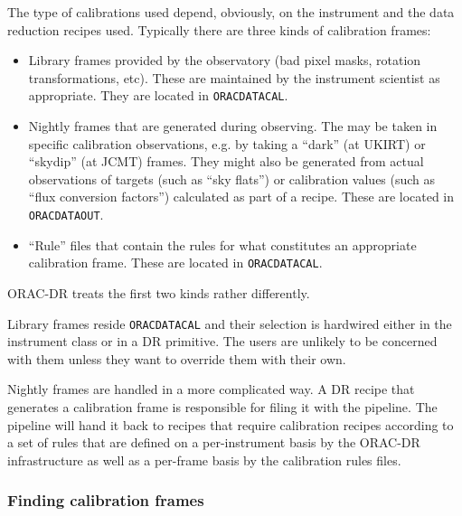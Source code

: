 \documentclass[twoside,11pt]{article}
\renewcommand{\_}{\texttt{\symbol{95}}}
\begin{document}
The type of calibrations used depend, obviously, on the instrument and
the data reduction recipes used. Typically there are three kinds of
calibration frames:

\begin{itemize}

\item

Library frames provided by the observatory (bad pixel masks, rotation
transformations, etc).  These are maintained by the instrument
scientist as appropriate.  They are located in \texttt{ORAC\_DATA\_CAL}.


\item

Nightly frames that are generated during observing.  The may be taken
in specific calibration observations, e.g. by taking a ``dark'' (at UKIRT)
or ``skydip'' (at JCMT) frames.  They might also be generated from
actual observations of targets (such as ``sky flats'') or
calibration values (such as ``flux conversion factors'') calculated
as part of a recipe.  These are located in \texttt{ORAC\_DATA\_OUT}.


\item

``Rule'' files that contain the rules for what constitutes an
appropriate calibration frame.  These are located in \texttt{ORAC\_DATA\_CAL}.

\end{itemize}


ORAC-DR treats the first two kinds rather differently.



Library frames reside \texttt{ORAC\_DATA\_CAL} and their selection is hardwired
either in the instrument class or in a DR primitive.  The users are
unlikely to be concerned with them unless they want to override them
with their own.



Nightly frames are handled in a more complicated way.  A DR recipe
that generates a calibration frame is responsible for filing it with
the pipeline.  The pipeline will hand it back to recipes that require
calibration recipes according to a set of rules that are defined on a
per-instrument basis by the ORAC-DR infrastructure as well as a
per-frame basis by the calibration rules files.

\subsubsection*{Finding calibration frames\label{The_ORAC-DR_Calibration_Selection_Finding_calibration_frames}}
\end{document}
